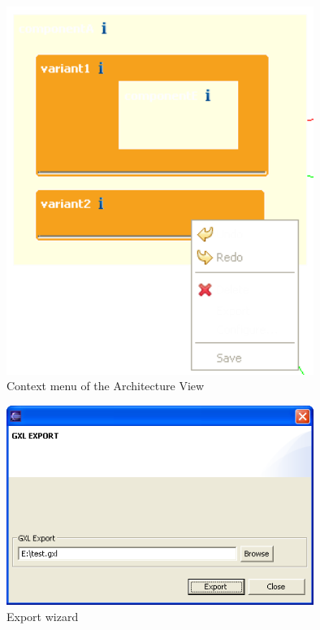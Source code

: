 \begin{figure}[h!]
\begin{center}
\includegraphics[width=10cm]{architecturekontext.png}
   \caption{Context menu of the Architecture View}
\label{archcontext}
\end{center}
\end{figure}\par

\begin{figure}[h!]
\begin{center}
\includegraphics[width=10cm]{export.png}
   \caption{Export wizard}
\label{export}
\end{center}
\end{figure}\par








